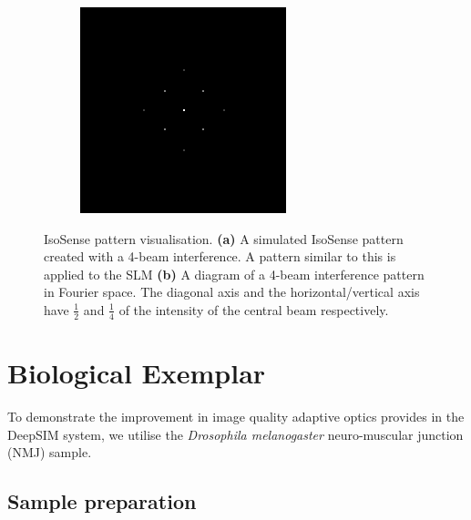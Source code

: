 \begin{figure}[h]
\begin{subfigure}{0.4\textwidth}
		\includegraphics[width=1\linewidth, scale=0.5]{./images/isosense_visualisation_ft.png}
		\caption{}
		\label{fig:isosense_visualisation_ft}
	\end{subfigure}
	\caption[IsoSense pattern visualisation.]{IsoSense pattern visualisation. \textbf{(a)} A simulated IsoSense pattern created with a 4-beam interference. A pattern similar to this is applied to the SLM \textbf{(b)} A diagram of a 4-beam interference pattern in Fourier space. The diagonal axis and the horizontal/vertical axis have $\frac{1}{2}$ and $\frac{1}{4}$ of the intensity of the central beam respectively.}
	\label{fig:isosense_visualisation}
\end{figure}

\section{Biological Exemplar}
\label{sec:DeepSIM_biology}

To demonstrate the improvement in image quality adaptive optics
provides in the DeepSIM system, we utilise the 
\textit{Drosophila melanogaster} neuro-muscular junction (NMJ) sample.

\subsection{Sample preparation}
\label{subsec:DeepSIM_sample_prep}

